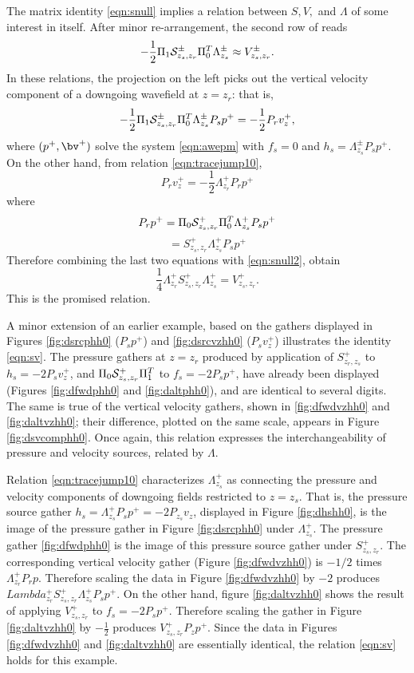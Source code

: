 The matrix identity \ref{eqn:snull} implies a relation between $S, V,$
and $\Lambda$ of some interest in itself. After minor re-arrangement, the second row of reads
\begin{equation}
  \label{eqn:snull2}
-\frac{1}{2}\Pi_1{\cal S}^{\pm}_{z_s,z_r}\Pi_0^T\Lambda^{\pm}_{z_s}  \approx
V^{\pm}_{z_s,z_r}.
\end{equation}
In these relations, the projection on the left picks out the vertical velocity component
of a downgoing wavefield at $z=z_r$: that is,
\[
-\frac{1}{2}\Pi_1{\cal S}^{\pm}_{z_s,z_r}\Pi_0^T\Lambda^{\pm}_{z_s}P_sp^+
=-\frac{1}{2}P_r v_z^+,
\]
where $(p^+, \bv^+)$ solve the system \ref{eqn:awepm} with $f_s=0$ and
$h_s = \Lambda^{\pm}_{z_s}P_sp^+$. On the other hand, from relation
\ref{eqn:tracejump10},
\[
  P_r v_z^+ = -\frac{1}{2}\Lambda^+_{z_r}P_r p^+
\]
where
\[
  P_r p^+ = \Pi_0{\cal S}^{+}_{z_s,z_r}\Pi_0^T\Lambda^{+}_{z_s}P_s
  p^+
\]
\[
  = S^+_{z_s,z_r}\Lambda^{+}_{z_s}P_sp^+
\]
Therefore combining the last two equations with \ref{eqn:snull2},
obtain
\begin{equation}
  \label{eqn:sv}
  \frac{1}{4}\Lambda^+_{z_r}S^+_{z_s,z_r}\Lambda^{+}_{z_s} = V^+_{z_s,z_r}.
\end{equation}
This is the promised relation.

A minor extension of an earlier example, based on the gathers
displayed in Figures \ref{fig:dsrcphh0} ($P_sp^+$) and
\ref{fig:dsrcvzhh0} ($P_sv_z^+$) illustrates the identity
\ref{eqn:sv}.
The pressure gathers at $z=z_r$ produced by application of
$S^+_{z_r,z_s}$ to $h_s=-2P_s v^+_z$, and $\Pi_0{\cal S}^+_{z_s,z_r}\Pi_1^T$ to $f_s
=-2P_sp^+$, have already been displayed (Figures \ref{fig:dfwdphh0}
and \ref{fig:daltphh0}), and are identical to several digits. The same 
is true of the vertical velocity gathers, shown in \ref{fig:dfwdvzhh0}
and \ref{fig:daltvzhh0}; their difference, plotted on the same scale,
appears in Figure \ref{fig:dsvcomphh0}. Once again, this relation
expresses the interchangeability of pressure and velocity sources,
related by $\Lambda$.

Relation \ref{eqn:tracejump10} characterizes
$\Lambda^+_{z_s}$ as connecting the pressure and velocity components
of downgoing fields restricted to $z=z_s$. That is, the pressure
source gather
$h_s=\Lambda^{+}_{z_s}P_s p^+ = -2
P_{z_s}v_z$, displayed in Figure \ref{fig:dhshh0}, is the image of the
pressure gather in Figure \ref{fig:dsrcphh0} under
$\Lambda^{+}_{z_s}$.
The pressure gather
\ref{fig:dfwdphh0} is the image of this pressure source gather under
$S^+_{z_s,z_r}$. The corresponding vertical velocity gather
(Figure \ref{fig:dfwdvzhh0}) is $-1/2$ times $\Lambda^+_{z_r}P_r
p$. Therefore scaling the data in Figure \ref{fig:dfwdvzhh0} by
$-2$ produces
$Lambda^+_{z_r}S^+_{z_s,z_r}\Lambda^{+}_{z_s}P_s p^+$. On the other
hand, figure \ref{fig:daltvzhh0} shows the result of applying
$V^+_{z_s,z_r}$ to $f_s=-2P_s p^+$. Therefore scaling the gather in
Figure \ref{fig:daltvzhh0} by $-\frac{1}{2}$ produces $V^+_{z_s,z_r}P_zp^+$.
Since the data in Figures \ref{fig:dfwdvzhh0} and \ref{fig:daltvzhh0}
are essentially identical, the relation \ref{eqn:sv} holds for this
example.

